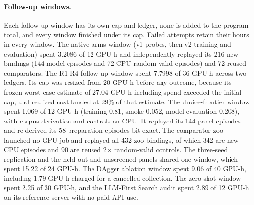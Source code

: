 \paragraph{Follow-up windows.}
Each follow-up window has its own cap and ledger, none is added to the program total, and every window finished under its cap. Failed attempts retain their hours in every window. The native-arms window (v1 probes, then v2 training and evaluation) spent 3.2086 of 12 GPU-h and independently replayed its 216 new bindings (144 model episodes and 72 CPU random-valid episodes) and 72 reused comparators. The R1-R4 follow-up window spent 7.7998 of 36 GPU-h across two ledgers. Its cap was resized from 20 GPU-h before any outcome, because its frozen worst-case estimate of 27.04 GPU-h including spend exceeded the initial cap, and realized cost landed at 29\% of that estimate. The choice-frontier window spent 1.069 of 12 GPU-h (training 0.81, smoke 0.052, model evaluation 0.208), with corpus derivation and controls on CPU. It replayed its 144 panel episodes and re-derived its 58 preparation episodes bit-exact. The comparator zoo launched no GPU job and replayed all 432 zoo bindings, of which 342 are new CPU episodes and 90 are reused 2$\times$ random-valid controls. The three-seed replication and the held-out and unscreened panels shared one window, which spent 15.22 of 24 GPU-h. The DAgger ablation window spent 9.06 of 40 GPU-h, including 1.79 GPU-h charged for a cancelled collection. The zero-shot window spent 2.25 of 30 GPU-h, and the LLM-First Search audit spent 2.89 of 12 GPU-h on its reference server with no paid API use.
